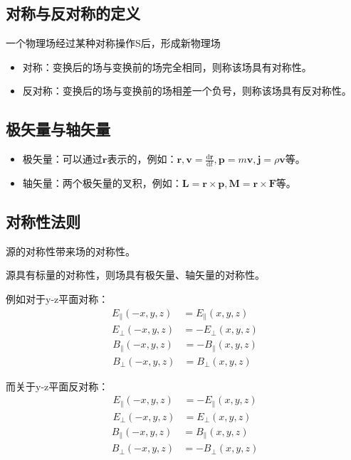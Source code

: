 \documentclass[12pt,onecolumn,a4paper]{book}
\numberwithin{table}{subsection}
\numberwithin{equation}{subsection}
\begin{document}
\subsection{对称与反对称的定义}

一个物理场经过某种对称操作S后，形成新物理场
\begin{itemize}
    \item 对称：变换后的场与变换前的场完全相同，则称该场具有对称性。
    \item 反对称：变换后的场与变换前的场相差一个负号，则称该场具有反对称性。
\end{itemize}

\subsection{极矢量与轴矢量}

\begin{itemize}
    \item 极矢量：可以通过$\mathbf{r}$表示的，例如：$\mathbf{r},\mathbf{v}= \frac{\mathrm{d} \mathbf{r}}{\mathrm{d} t},\mathbf{p}=m\mathbf{v},\mathbf{j}=\rho \mathbf{v}$等。
    \item 轴矢量：两个极矢量的叉积，例如：$\mathbf{L}=\mathbf{r} \times \mathbf{p},\mathbf{M}=\mathbf{r} \times \mathbf{F}$等。
\end{itemize}

\subsection{对称性法则}

源的对称性带来场的对称性。

源具有标量的对称性，则场具有极矢量、轴矢量的对称性。

例如对于y-z平面对称：
\begin{align}
    E_{\parallel}(-x,y,z) & = E_{\parallel}(x,y,z) \\
    E_{\perp}(-x,y,z)     & = -E_{\perp}(x,y,z)
\end{align}
\begin{align}
    B_{\parallel}(-x,y,z) & = - B_{\parallel}(x,y,z) \\
    B_{\perp}(-x,y,z)     & = B_{\perp}(x,y,z)
\end{align}

而关于y-z平面反对称：
\begin{align}
    E_{\parallel}(-x,y,z) & = -E_{\parallel}(x,y,z) \\
    E_{\perp}(-x,y,z)     & = E_{\perp}(x,y,z)
\end{align}
\begin{align}
    B_{\parallel}(-x,y,z) & = B_{\parallel}(x,y,z) \\
    B_{\perp}(-x,y,z)     & = -B_{\perp}(x,y,z)
\end{align}
\end{document}
